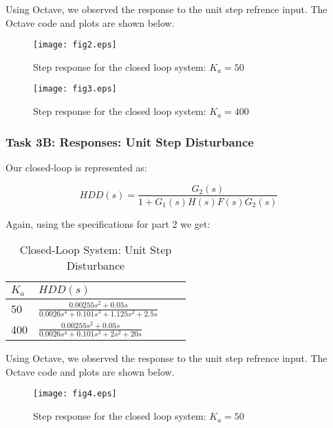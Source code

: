 \documentclass{article}
\newcommand{\matlab}[1]{%
%
}
\begin{document}
Using Octave, we observed the response to the unit step refrence input. The
Octave code and plots are shown below. 

\matlab{fig2.m}

\begin{figure}[H]
  \caption{Step response for the closed loop system: $K_a = 50$}
  \centering
  \texttt{[image: fig2.eps]}
\end{figure}

\matlab{fig3.m}

\begin{figure}[H]
  \caption{Step response for the closed loop system: $K_a = 400$}
  \centering
  \texttt{[image: fig3.eps]}
\end{figure}

\subsubsection*{Task 3B: Responses: Unit Step Disturbance}


Our closed-loop is represented as: 

$$ HDD(s) = \frac{G_2(s)}{1 + G_1(s)H(s)F(s)G_2(s)} $$ 

Again, using the specifications for part 2 we get:

\begin{table}[H]
\begin{center}
  \begin{tabular}{ | l | l | l | p{5cm} |}
  \hline
  \textbf{$K_a$} & \textbf{$HDD(s)$}  \\ \hline
  50 & $\frac{0.00255s^2 + 0.05s}{0.0026s^4 + 0.101s^3 + 1.125s^2 + 2.5s}$\\ \hline 
  400 & $\frac{0.00255s^2 + 0.05s}{0.0026s^4 + 0.101s^3 + 2s^2 + 20s}$\\ \hline 
 \end{tabular}
\end{center}
\caption{Closed-Loop System: Unit Step Disturbance}
\end{table}

Using Octave, we observed the response to the unit step refrence input. The
Octave code and plots are shown below. 

\matlab{fig4.m}

\begin{figure}[H]
  \caption{Step response for the closed loop system: $K_a = 50$}
  \centering
  \texttt{[image: fig4.eps]}
\end{figure}
\end{document}
